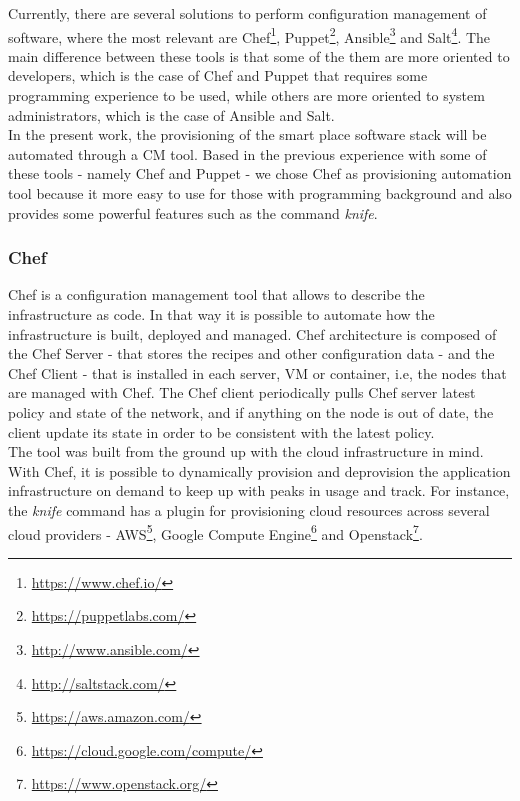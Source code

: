 Currently, there are several solutions to perform configuration management of software, where the
most relevant are Chef\footnote{\url{https://www.chef.io/}}, Puppet\footnote{\url{https://puppetlabs.com/}},
Ansible\footnote{\url{http://www.ansible.com/}} and Salt\footnote{\url{http://saltstack.com/}}. The main difference
between these tools is that some of the them are more oriented to developers, which is the case of Chef and
Puppet that requires some programming experience to be used, while others are more oriented to system
administrators, which is the case of Ansible and Salt.\\

In the present work, the provisioning of the smart place software stack will be automated through
a \gls{CM} tool. Based in the previous experience with some of these tools - namely Chef and Puppet -
we chose Chef as provisioning automation tool because it more easy to use for those with programming
background and also provides some powerful features such as the command \textit{knife}.

\subsubsection{Chef}
\label{subs:chef}
Chef is a configuration management tool that allows to describe the infrastructure as code.
In that way it is possible to automate how the infrastructure is built, deployed and managed.
Chef architecture is composed of the Chef Server - that stores the recipes and other configuration
data - and the Chef Client - that is installed in each server, \gls{VM} or container, i.e, the nodes that
are managed with Chef. The Chef client periodically pulls Chef server latest policy and state of the
network, and if anything on the node is out of date, the client update its state in order to be
consistent with the latest policy.\\

The tool was built from the ground up with the cloud infrastructure in mind. With Chef, it is possible
to dynamically provision and deprovision the application infrastructure on demand to keep up with
peaks in usage and track. For instance, the \textit{knife} command has a plugin for provisioning cloud
resources across several cloud providers - \gls{AWS}\footnote{\url{https://aws.amazon.com/}}, Google
Compute Engine\footnote{\url{https://cloud.google.com/compute/}} and Openstack\footnote{\url{https://www.openstack.org/}}.

